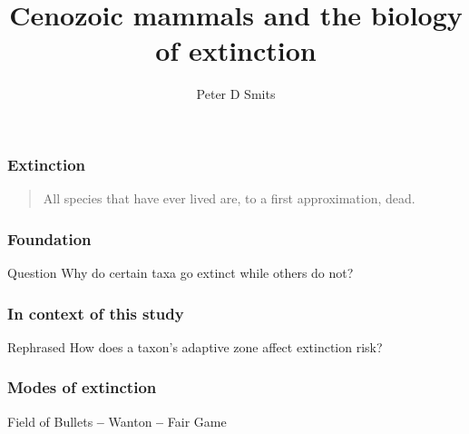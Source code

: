 \documentclass{beamer}
\title{Cenozoic mammals and the biology of extinction}
\author{Peter D Smits}
\institute{Committee on Evolutionary Biology, University of Chicago}
\begin{document}
\begin{frame}
  \maketitle
\end{frame}

\begin{frame}
  \frametitle{Extinction}
  \begin{quotation}
    All species that have ever lived are, to a first approximation, dead.

    \tiny{}
  \end{quotation}
\end{frame}

\begin{frame}
  \frametitle{Foundation}
  \begin{alertblock}{Question}
    Why do certain taxa go extinct while others do not?
  \end{alertblock}
\end{frame}

\begin{frame}
  \frametitle{In context of this study}
  \begin{block}{Rephrased}
    How does a taxon's \alert{adaptive zone} affect \alert{extinction risk?}
  \end{block}
\end{frame}

\begin{frame}
  \frametitle{Modes of extinction}

   Field of Bullets 
   \textbf{--} 
   Wanton 
   \textbf{--} 
   Fair Game 

  \bigskip

  \tiny{}

\end{frame}
\end{document}
